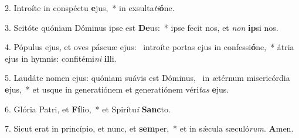 2. Introíte in conspéctu \textbf{e}jus,~*  in exsulta\textit{ti}\textbf{ó}ne.\

3. Scitóte quóniam Dóminus ipse est \textbf{De}us:~*  ipse fecit nos, et \textit{non} \textbf{ip}si nos.\

4. Pópulus ejus, et oves páscuæ ejus: \dag\  introíte portas ejus in confessi\textbf{ó}ne,~*  átria ejus in hymnis: confitémi\textit{ni} \textbf{il}li.\

5. Laudáte nomen ejus: quóniam suávis est Dóminus, \dag\  in ætérnum misericórdia \textbf{e}jus,~*  et usque in generatiónem et generatiónem véri\textit{tas} \textbf{e}jus.\

6. Glória Patri, et \textbf{Fí}lio,~*  et Spirítu\textit{i} \textbf{Sanc}to.\

7. Sicut erat in princípio, et nunc, et \textbf{sem}per,~*  et in sǽcula sæculó\textit{rum}. \textbf{A}men.\


